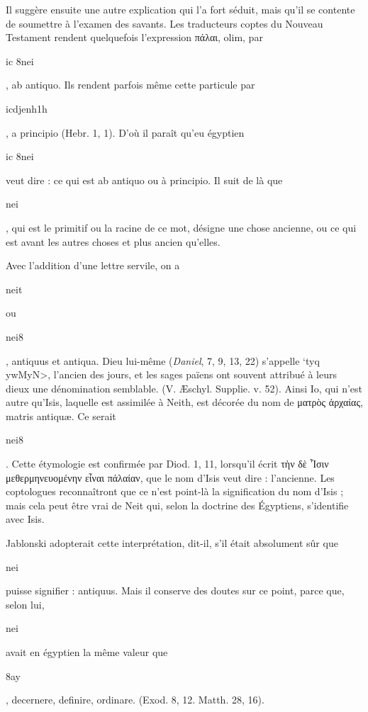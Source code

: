\documentclass[a4paper, 11pt, oneside]{article}
\begin{document}
Il suggère ensuite une autre explication qui l'a fort séduit, mais qu'il se contente de soumettre à l'examen des savants. Les traducteurs coptes du Nouveau Testament rendent quelquefois l'expression πάλαι, olim, par \begin{coptic}ic 8nei\end{coptic}, ab antiquo. Ils rendent parfois même cette particule par \begin{coptic}icdjenh1h\end{coptic}, a principio (Hebr. 1, 1). D'où il paraît qu'eu égyptien \begin{coptic}ic 8nei\end{coptic} veut dire : ce qui est ab antiquo ou à principio. Il suit de là que \begin{coptic}nei\end{coptic}, qui est le primitif ou la racine de ce mot, désigne une chose ancienne, ou ce qui est avant les autres choses et plus ancien qu'elles.

Avec l'addition d'une lettre servile, on a \begin{coptic}neit\end{coptic} ou \begin{coptic}nei8\end{coptic}, antiquus et antiqua. Dieu lui-même (\emph{Daniel}, 7, 9, 13, 22) s'appelle \foreignlanguage{hebrew}{\<`tyq ywMyN>}, l'ancien des jours, et les sages païens ont souvent attribué à leurs dieux une dénomination semblable. (V. Æschyl. Supplie. v. 52). Ainsi Io, qui n'est autre qu'Isis, laquelle est assimilée à Neith, est décorée du nom de ματρὸς ἀρχαίας, matris antiquæ. Ce serait \begin{coptic}nei8\end{coptic}. Cette étymologie est confirmée par Diod. 1, 11, lorsqu'il écrit τὴν δὲ Ἶσιν μεθερμηνευομένην εἶναι πάλαίαν, que le nom d'Isis veut dire : l'ancienne. Les coptologues reconnaîtront que ce n'est point-là la signification du nom d'Isis ; mais cela peut être vrai de Neit qui, selon la doctrine des Égyptiens, s'identifie avec Isis.

Jablonski adopterait cette interprétation, dit-il, s'il était absolument sûr que \begin{coptic}nei\end{coptic} puisse signifier : antiquus. Mais il conserve des doutes sur ce point, parce que, selon lui, \begin{coptic}nei\end{coptic} avait en égyptien la même valeur que \begin{coptic}8ay\end{coptic}, decernere, definire, ordinare. (Exod. 8, 12. Matth. 28, 16).
\end{document}
